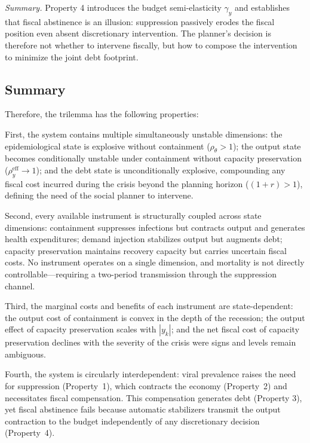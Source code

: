 \documentclass[12pt, a4paper]{article}
\begin{document}
\vspace{5mm}

\noindent\textit{Summary.} Property 4 introduces the budget semi-elasticity $\gamma_y$ and establishes that fiscal abstinence is an illusion: suppression passively erodes the fiscal position even absent discretionary intervention. The planner's decision is therefore not whether to intervene fiscally, but how to compose the intervention to minimize the joint debt footprint. 

\subsection{Summary}
\label{sec:Sumary}
Therefore, the trilemma has the following properties: 

First, the system contains multiple simultaneously unstable dimensions: the epidemiological state is explosive without containment ($\rho_\theta > 1$); the output state becomes conditionally unstable under containment without capacity preservation ($\rho_y^{\text{eff}} \to 1$); and the debt state is unconditionally explosive, compounding any fiscal cost incurred during the crisis beyond the planning horizon ($(1+r) > 1$), defining the need of the social planner to intervene. 

Second, every available instrument is structurally coupled across state dimensions: containment suppresses infections but contracts output and generates health expenditures; demand injection stabilizes output but augments debt; capacity preservation maintains recovery capacity but carries uncertain fiscal costs. No instrument operates on a single dimension, and mortality is not directly controllable---requiring a two-period transmission through the suppression channel. 

Third, the marginal costs and benefits of each instrument are state-dependent: the output cost of containment is convex in the depth of the recession; the output effect of capacity preservation scales with $|y_k|$; and the net fiscal cost of capacity preservation declines with the severity of the crisis were signs and levels remain ambiguous.

Fourth, the system is circularly interdependent: viral prevalence raises the need for suppression (Property~1), which contracts the economy (Property~2) and necessitates fiscal compensation. This compensation generates debt (Property 3), yet fiscal abstinence fails because automatic stabilizers transmit the output contraction to the budget independently of any discretionary decision (Property~4).
\end{document}
